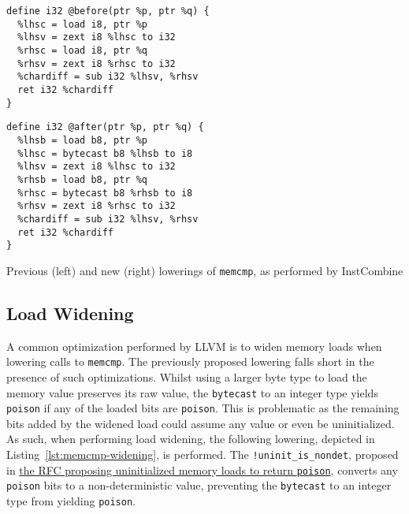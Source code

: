 \documentclass[a4paper,12pt]{article}
\begin{document}
\begin{listing}[h]
  \begin{minipage}{0.48\textwidth}
    \begin{verbatim}
define i32 @before(ptr %p, ptr %q) {
  %lhsc = load i8, ptr %p
  %lhsv = zext i8 %lhsc to i32
  %rhsc = load i8, ptr %q
  %rhsv = zext i8 %rhsc to i32
  %chardiff = sub i32 %lhsv, %rhsv
  ret i32 %chardiff
}
    \end{verbatim}
  \end{minipage}
  \begin{minipage}{0.45\textwidth}
    \begin{verbatim}
define i32 @after(ptr %p, ptr %q) {
  %lhsb = load b8, ptr %p
  %lhsc = bytecast b8 %lhsb to i8
  %lhsv = zext i8 %lhsc to i32
  %rhsb = load b8, ptr %q
  %rhsc = bytecast b8 %rhsb to i8
  %rhsv = zext i8 %rhsc to i32
  %chardiff = sub i32 %lhsv, %rhsv
  ret i32 %chardiff
}
    \end{verbatim}
  \end{minipage}
  \caption{Previous (left) and new (right) lowerings of \texttt{memcmp}, as performed by InstCombine}
  \label{lst:memcmp-lowering}
\end{listing}

\subsection{Load Widening}

A common optimization performed by LLVM is to widen memory loads when lowering calls to \texttt{memcmp}.
The previously proposed lowering falls short in the presence of such optimizations.
Whilst using a larger byte type to load the memory value preserves its raw value, the \texttt{bytecast} to an integer type yields \texttt{poison} if any of the loaded bits are \texttt{poison}.
This is problematic as the remaining bits added by the widened load could assume any value or even be uninitialized.
As such, when performing load widening, the following lowering, depicted in Listing~\ref{lst:memcmp-widening}, is performed.
The \texttt{!uninit\_is\_nondet}, proposed in \href{https://discourse.llvm.org/t/rfc-load-instruction-uninitialized-memory-semantics/67481}{the RFC proposing uninitialized memory loads to return \texttt{poison}}, converts any \texttt{poison} bits to a non-deterministic value, preventing the \texttt{bytecast} to an integer type from yielding \texttt{poison}.
\end{document}
